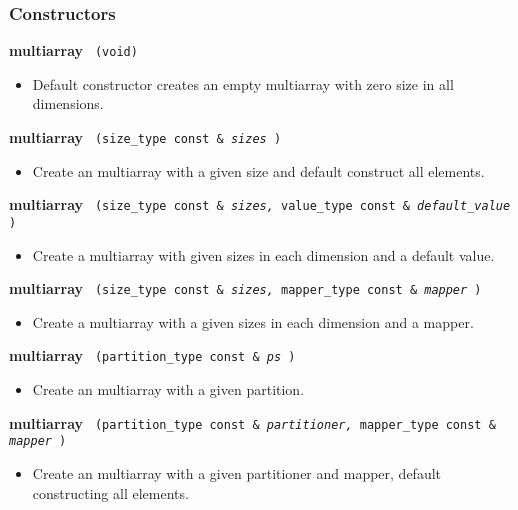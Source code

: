 \subsubsection{Constructors}

\noindent
\textbf{multiarray}%
\texttt{%
(void)
}

\begin{itemize}
\item
Default constructor creates an empty multiarray with zero size in all dimensions.
\end{itemize}
 
\noindent
\textbf{multiarray}%
\texttt{%
(size\_type const \&
\textit{sizes}%
)
}

\begin{itemize}
\item
Create an multiarray with a given size and default construct all elements. 
\end{itemize}
 
\noindent
\textbf{multiarray}%
\texttt{%
(size\_type const \&
\textit{sizes,}%
value\_type const \&
\textit{default\_value}%
)
}

\begin{itemize}
\item
Create a multiarray with given sizes in each dimension and a default value. 
\end{itemize}
 
\noindent
\textbf{multiarray}%
\texttt{%
(size\_type const \&
\textit{sizes,}%
mapper\_type const \&
\textit{mapper}%
)
}

\begin{itemize}
\item
Create a multiarray with a given sizes in each dimension and a mapper. 
\end{itemize}
 
\noindent
\textbf{multiarray}%
\texttt{%
(partition\_type const \&
\textit{ps}%
)
}

\begin{itemize}
\item
Create an multiarray with a given partition. 
\end{itemize}
 
\noindent
\textbf{multiarray}%
\texttt{%
(partition\_type const \&
\textit{partitioner,}%
mapper\_type const \&
\textit{mapper}%
)
}

\begin{itemize}
\item
Create an multiarray with a given partitioner and mapper, default constructing all elements. 
\end{itemize}
 
